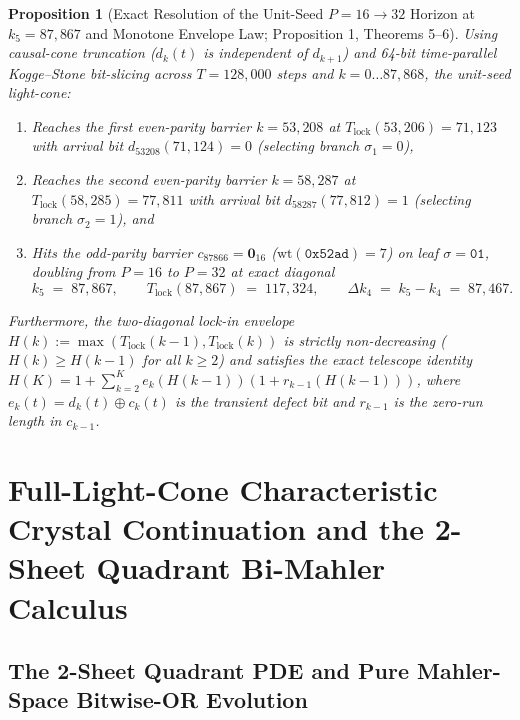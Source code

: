 \documentclass[11pt,a4paper]{article}
\newtheorem{proposition}[theorem]{Proposition}
\theoremstyle{definition}
\theoremstyle{remark}
\begin{document}
\begin{proposition}[Exact Resolution of the Unit-Seed $P = 16 \to 32$ Horizon at $k_5 = 87{,}867$ and Monotone Envelope Law; Proposition 1, Theorems 5--6]\label{prop:k5}
Using causal-cone truncation ($d_k(t)$ is independent of $d_{k+1}$) and 64-bit time-parallel Kogge--Stone bit-slicing across $T = 128{,}000$ steps and $k = 0 \dots 87{,}868$, the unit-seed light-cone:
\begin{enumerate}
  \item Reaches the first even-parity barrier $k = 53{,}208$ at $T_{\mathrm{lock}}(53{,}206) = 71{,}123$ with arrival bit $d_{53208}(71{,}124) = 0$ (selecting branch $\sigma_1 = 0$),
  \item Reaches the second even-parity barrier $k = 58{,}287$ at $T_{\mathrm{lock}}(58{,}285) = 77{,}811$ with arrival bit $d_{58287}(77{,}812) = 1$ (selecting branch $\sigma_2 = 1$), and
  \item Hits the odd-parity barrier $c_{87866} = \mathbf{0}_{16}$ ($\mathrm{wt}(\mathtt{0x52ad}) = 7$) on leaf $\sigma = \mathtt{01}$, doubling from $P = 16$ to $P = 32$ at exact diagonal
  \begin{equation}
    k_5 \;=\; 87{,}867, \qquad T_{\mathrm{lock}}(87{,}867) \;=\; 117{,}324, \qquad \Delta k_4 \;=\; k_5 - k_4 \;=\; 87{,}467.
  \end{equation}
\end{enumerate}
Furthermore, the two-diagonal lock-in envelope $H(k) := \max(T_{\mathrm{lock}}(k-1), T_{\mathrm{lock}}(k))$ is strictly non-decreasing ($H(k) \ge H(k-1)$ for all $k \ge 2$) and satisfies the exact telescope identity $H(K) = 1 + \sum_{k=2}^K e_k(H(k-1))(1 + r_{k-1}(H(k-1)))$, where $e_k(t) = d_k(t) \oplus c_k(t)$ is the transient defect bit and $r_{k-1}$ is the zero-run length in $c_{k-1}$.
\end{proposition}

\section{Full-Light-Cone Characteristic Crystal Continuation and the 2-Sheet Quadrant Bi-Mahler Calculus}

\subsection{The 2-Sheet Quadrant PDE and Pure Mahler-Space Bitwise-OR Evolution}
\end{document}
